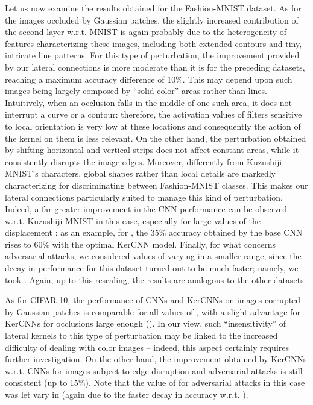 \documentclass[11pt,oneside,reqno]{amsart}
\begin{document}
 Let us now examine the results obtained for the Fashion-MNIST dataset. As for the images occluded by Gaussian patches, the slightly increased contribution of the second layer w.r.t. MNIST is again probably due to the heterogeneity of features characterizing these images, including both extended contours and tiny, intricate line patterns. For this type of perturbation, the improvement provided by our lateral connections is more moderate than it is for the preceding datasets, reaching a maximum accuracy difference of 10\%. This may depend upon such images being largely composed by ``solid color'' areas rather than lines. Intuitively, when an occlusion falls in the middle of one such area, it does not interrupt a curve or a contour: therefore, the activation values of filters sensitive to local orientation is very low at these locations and consequently the action of the kernel on them is less relevant. On the other hand, the perturbation obtained by shifting horizontal and vertical strips does not affect constant areas, while it consistently disrupts the image edges. Moreover, differently from Kuzushiji-MNIST's characters, global shapes rather than local details are markedly characterizing for discriminating between Fashion-MNIST classes. This makes our lateral connections particularly suited to manage this kind of perturbation. Indeed, a far greater improvement in the CNN performance can be observed w.r.t. Kuzushiji-MNIST in this case, especially for large values of the displacement : as an example, for , the 35\% accuracy obtained by the base CNN rises to 60\% with the optimal KerCNN model. Finally, for what concerns adversarial attacks, we considered values of  varying in a smaller range, since the decay in performance for this dataset turned out to be much faster; namely, we took . Again, up to this rescaling, the results are analogous to the other datasets.
 
 As for CIFAR-10, the performance of CNNs and KerCNNs on images corrupted by Gaussian patches is comparable for all values of , with a slight advantage for KerCNNs for occlusions large enough (). In our view, such ``insensitivity'' of lateral kernels to this type of perturbation may be linked to the increased difficulty of dealing with color images -- indeed, this aspect certainly requires further investigation. On the other hand, the improvement obtained by KerCNNs w.r.t. CNNs for images subject to edge disruption and adversarial attacks is still consistent (up to 15\%). Note that the value of  for adversarial attacks in this case was let vary in  (again due to the faster decay in accuracy w.r.t. ). 
 
\end{document}
